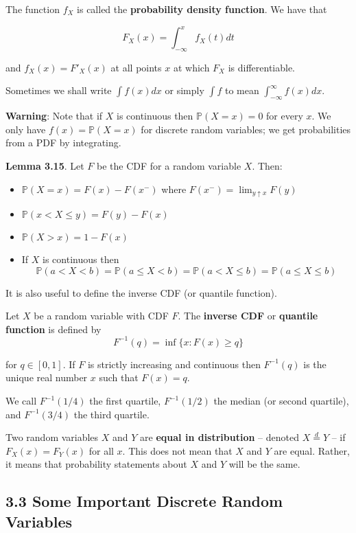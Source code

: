 The function \(f_X\) is called the \textbf{probability density function}. We have that

\[
F_X(x) = \int_{-\infty}^x f_X(t) dt
\]

and \(f_X(x) = F'_X(x)\) at all points \(x\) at which \(F_X\) is differentiable.

Sometimes we shall write \(\int f(x) dx\) or simply \(\int f\) to mean \(\int_{-\infty}^{\infty} f(x) dx\).

\textbf{Warning}: Note that if \(X\) is continuous then \(\mathbb{P}(X = x) = 0\) for every \(x\). We only have \(f(x) = \mathbb{P}(X = x)\) for discrete random variables; we get probabilities from a PDF by integrating.

\textbf{Lemma 3.15}. Let \(F\) be the CDF for a random variable \(X\).
Then:

\begin{itemize}
\item
  \(\mathbb{P}(X = x) = F(x) - F(x^-)\) where
  \(F(x^-) = \lim_{y \uparrow x} F(y)\)
\item
  \(\mathbb{P}(x < X \leq y) = F(y) - F(x)\)
\item
  \(\mathbb{P}(X > x) = 1 - F(x)\)
\item
  If \(X\) is continuous then
  \[
  \mathbb{P}(a < X < b) 
  = \mathbb{P}(a \leq X < b) 
  = \mathbb{P}(a < X \leq b) 
  = \mathbb{P}(a \leq X \leq b)
  \]
\end{itemize}

It is also useful to define the inverse CDF (or quantile function).

Let \(X\) be a random variable with CDF \(F\). The \textbf{inverse CDF} or \textbf{quantile function} is defined by
\[
F^{-1}(q) = \inf \{ x : F(x) \ge q \}
\]

for \(q \in [0, 1]\). If \(F\) is strictly increasing and continuous then \(F^{-1}(q)\) is the unique real number \(x\) such that \(F(x) = q\).

We call \(F^{-1}(1/4)\) the first quartile, \(F^{-1}(1/2)\) the median (or second quartile), and \(F^{-1}(3/4)\) the third quartile.

Two random variables \(X\) and \(Y\) are \textbf{equal in distribution} -- denoted \(X \overset{d}= Y\) -- if \(F_X(x) = F_Y(x)\) for all \(x\). This does not mean that \(X\) and \(Y\) are equal. Rather, it means that probability statements about \(X\) and \(Y\) will be the same.

\subsection*{3.3 Some Important Discrete Random Variables}\label{some-important-discrete-random-variables}

